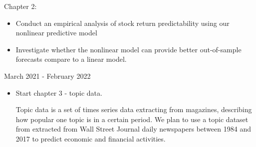 \documentclass[12pt,a4paper]{article}
\begin{document}

Chapter 2:
\begin{itemize}
	\item Conduct an empirical analysis of stock return predictability using our nonlinear predictive model
	
	\item Investigate whether the nonlinear model can provide better out-of-sample forecasts compare to a linear model.
	
\end{itemize}


\noindent March 2021 - February 2022

\begin{itemize}
	\item Start chapter 3 - topic data.
	
	Topic data is a set of times series data extracting from magazines, describing how popular one topic is in a certain period. We plan to use a topic dataset from \cite{bybee2020structure} extracted from Wall Street Journal daily newspapers between 1984 and 2017 to predict economic and financial activities. 
	  
\end{itemize}
\pagebreak
	
\end{document}
